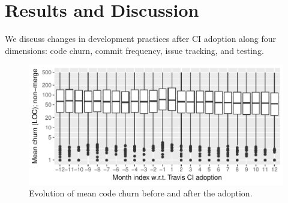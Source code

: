 
\section{Results and Discussion}
\label{sec:results}
We discuss changes in development practices after CI adoption along four 
dimensions: code churn, commit frequency, issue tracking, and testing. 

%

\begin{figure}[t]
\centering
\includegraphics[width=\columnwidth, clip=true, trim=0 0 0 0]{figures/churn.pdf}
\caption{Evolution of mean code churn before and after the \Tvis adoption.}
\label{fig:churn}
\end{figure}

